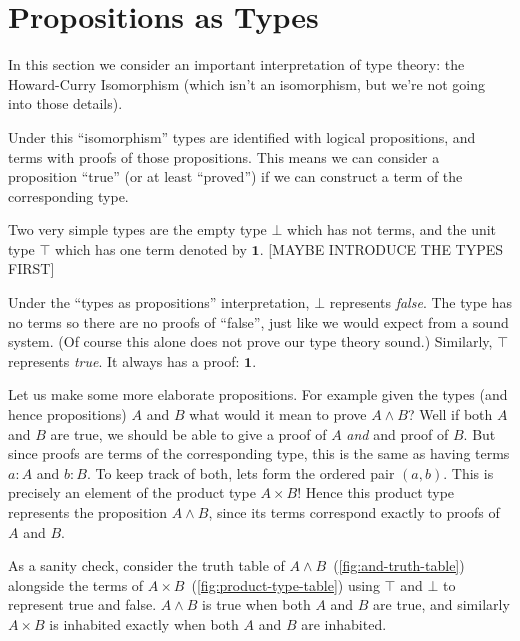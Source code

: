 \section{Propositions as Types}

In this section we consider an important interpretation of type theory: the
Howard-Curry Isomorphism (which isn't an isomorphism, but we're not going into
those details).

Under this ``isomorphism'' types are identified with logical propositions, and
terms with proofs of those propositions. This means we can consider a
proposition ``true'' (or at least ``proved'') if we can construct a term of the
corresponding type.

Two very simple types are the empty type $\bot$ which has not terms, and the
unit type $\top$ which has one term denoted by $\mathbf{1}$. [MAYBE INTRODUCE
THE TYPES FIRST]

Under the ``types as propositions'' interpretation, $\bot$ represents
\emph{false}. The type has no terms so there are no proofs of ``false'', just
like we would expect from a sound system. (Of course this alone does not prove
our type theory sound.) Similarly, $\top$ represents \emph{true}. It always has
a proof: $\mathbf{1}$.

Let us make some more elaborate propositions. For example given the types (and
hence propositions) $A$ and $B$ what would it mean to prove $A \land B$? Well if
both $A$ and $B$ are true, we should be able to give a proof of $A$ \emph{and}
and proof of $B$. But since proofs are terms of the corresponding type, this is
the same as having terms $a : A$ and $b : B$. To keep track of both, lets form
the ordered pair $(a, b)$. This is precisely an element of the product type $A
\times B$! Hence this product type represents the proposition $A \land B$, since
its terms correspond exactly to proofs of $A$ and $B$.

As a sanity check, consider the truth table of $A \land B$~(\autoref{fig:and-truth-table}) alongside the terms of $A
\times B$~(\autoref{fig:product-type-table}) using $\top$ and $\bot$ to represent true and false. $A \land B$ is
true when both $A$ and $B$ are true, and similarly $A \times B$ is inhabited
exactly when both $A$ and $B$ are inhabited.

